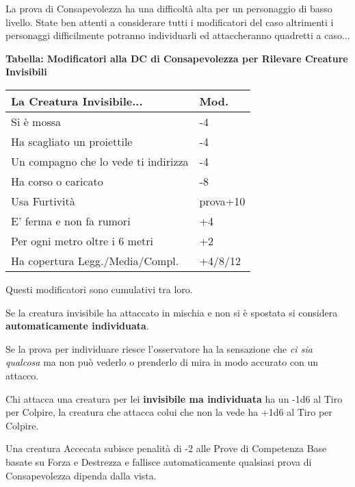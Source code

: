 \begin{multicols}{2}
\begin{narratore}[Invisibilità]
La prova di Consapevolezza ha una difficoltà alta per un personaggio di basso livello. State ben attenti a considerare tutti i modificatori del caso altrimenti i personaggi difficilmente potranno individuarli ed attaccheranno quadretti a caso...
\end{narratore}

\bigskip

\textbf{Tabella: Modificatori alla DC di Consapevolezza per Rilevare Creature Invisibili}

\medskip

\noindent\begin{tabularx}{\linewidth}{Xl}
	\toprule
\rowcolor{gray!20}\textbf{La Creatura Invisibile...} & \textbf{Mod.}\\
\toprule
Si è mossa& -4\\
\rowcolor{gray!20}Ha scagliato un proiettile & -4\\
Un compagno che lo vede ti indirizza & -4\\
\rowcolor{gray!20}Ha corso o caricato& -8\\
Usa Furtività & prova+10\\
\rowcolor{gray!20}E' ferma e non fa rumori & +4\\
Per ogni metro oltre i 6 metri & +2\\
\rowcolor{gray!20}Ha copertura Legg./Media/Compl. & +4/8/12
\end{tabularx}

\medskip

Questi modificatori sono cumulativi tra loro.

Se la creatura invisibile ha attaccato in mischia e non si è spostata si considera \textbf{automaticamente individuata}.

Se la prova per individuare riesce l'osservatore ha la sensazione che \emph{ci sia qualcosa} ma non può vederlo o prenderlo di mira in modo accurato con un attacco.

Chi attacca una creatura per lei \textbf{invisibile ma individuata} ha un -1d6 al Tiro per Colpire, la creatura che attacca colui che non la vede ha +1d6 al Tiro per Colpire.

Una creatura Accecata subisce penalità di -2 alle Prove di Competenza Base basate su Forza e Destrezza e fallisce automaticamente qualsiasi prova di Consapevolezza dipenda dalla vista.


\end{multicols}
